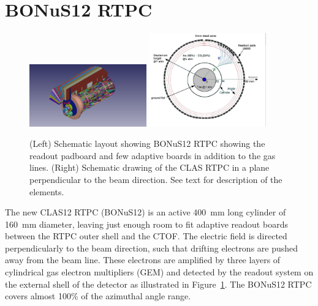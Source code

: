 \section{BONuS12 RTPC} 

\begin{figure}
  \begin{center}
    \includegraphics[angle=0, width=0.45\textwidth, clip,trim=50mm 10mm 80mm 
     0mm]{figures/Bonus12_cad.png}
    \includegraphics[angle=0, width=0.45\textwidth,clip,trim=0mm 10mm 20mm 0mm 
     ]{figures/NKsBXp.png}
     \caption{(Left) Schematic layout showing BONuS12 RTPC showing the readout 
     padboard and few adaptive boards in addition to the gas lines. (Right) 
     Schematic drawing of the CLAS RTPC in a plane perpendicular to the beam 
     direction. See text for description of the elements.}
    \label{fig:bonus12}
  \end{center}
\end{figure}

The new CLAS12 RTPC (BONuS12) is an active 400~mm long cylinder of 160~mm 
diameter, leaving just enough room to fit adaptive readout boards between the 
RTPC outer shell and the CTOF. The electric field is directed 
perpendicularly to the beam direction, such that drifting electrons are pushed 
away from the beam line. These electrons are amplified by three layers of 
cylindrical gas electron multipliers (GEM) and detected by the readout system 
on the external shell of the detector as illustrated in 
Figure~\ref{fig:bonus12}. The BONuS12 RTPC covers almost 100\% of the azimuthal 
angle range.

